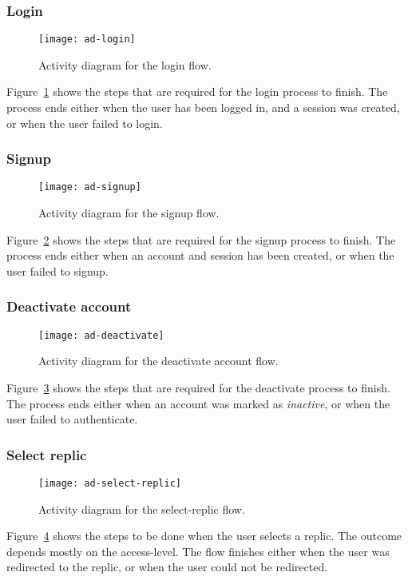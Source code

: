 \subsubsection{Login}
\begin{figure}[H]
    \centering
    \texttt{[image: ad-login]}
    \caption{Activity diagram for the login flow.}
    \label{fig:ad:login}
\end{figure}

Figure~\ref{fig:ad:login} shows the steps that are required for the login process to finish.
The process ends either when the user has been logged in, and a session was created, or when the user failed to login.

\subsubsection{Signup}
\begin{figure}[H]
    \centering
    \texttt{[image: ad-signup]}
    \caption{Activity diagram for the signup flow.}
    \label{fig:ad:signup}
\end{figure}

Figure~\ref{fig:ad:signup} shows the steps that are required for the signup process to finish.
The process ends either when an account and session has been created, or when the user failed to signup.

\subsubsection{Deactivate account}
\begin{figure}[H]
    \centering
    \texttt{[image: ad-deactivate]}
    \caption{Activity diagram for the deactivate account flow.}
    \label{fig:ad:deactivate}
\end{figure}

Figure~\ref{fig:ad:deactivate} shows the steps that are required for the deactivate process to finish.
The process ends either when an account was marked as \textit{inactive}, or when the user failed to authenticate.

\subsubsection{Select replic}
\begin{figure}[H]
    \centering
    \texttt{[image: ad-select-replic]}
    \caption{Activity diagram for the select-replic flow.}
    \label{fig:ad:select-replic}
\end{figure}

Figure~\ref{fig:ad:select-replic} shows the steps to be done when the user selects a replic.
The outcome depends mostly on the access-level.
The flow finishes either when the user was redirected to the replic, or when the user could not be redirected.